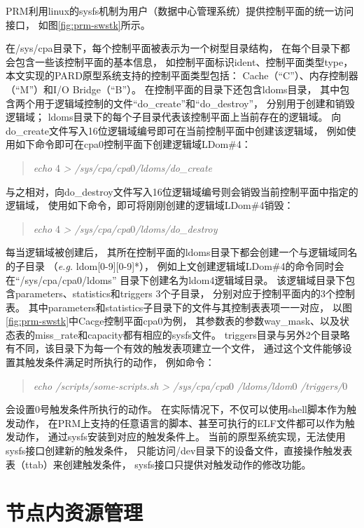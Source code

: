 PRM利用linux的sysfs机制为用户（数据中心管理系统）提供控制平面的统一访问接口，
如图\ref{fig:prm-swstk}所示。

在/sys/cpa目录下，每个控制平面被表示为一个树型目录结构，
在每个目录下都会包含一些该控制平面的基本信息，
如控制平面标识ident、控制平面类型type，
本文实现的PARD原型系统支持的控制平面类型包括：
Cache（``C''）、内存控制器（``M''）和I/O Bridge（``B''）。
在控制平面的目录下还包含ldoms目录，
其中包含两个用于逻辑域控制的文件``do\_create''和``do\_destroy''，
分别用于创建和销毁逻辑域；
ldoms目录下的每个子目录代表该控制平面上当前存在的逻辑域。
向do\_create文件写入16位逻辑域编号即可在当前控制平面中创建该逻辑域，
例如使用如下命令即可在cpa0控制平面下创建逻辑域LDom\#4：
\begin{verse}
\textit{echo} 4 \textit{> /sys/cpa/cpa}0\textit{/ldoms/do\_create}
\end{verse}
与之相对，向do\_destroy文件写入16位逻辑域编号则会销毁当前控制平面中指定的逻辑域，
使用如下命令，即可将刚刚创建的逻辑域LDom\#4销毁：
\begin{verse}
\textit{echo} 4 \textit{> /sys/cpa/cpa}0\textit{/ldoms/do\_destroy}
\end{verse}

每当逻辑域被创建后，
其所在控制平面的ldoms目录下都会创建一个与逻辑域同名的子目录
（\textit{e.g.} ldom[0-9][0-9]*），
例如上文创建逻辑域LDom\#4的命令同时会在``/sys/cpa/cpa0/ldoms''
目录下创建名为ldom4逻辑域目录。
该逻辑域目录下包含parameters、statistics和triggers 3个子目录，
分别对应于控制平面内的3个控制表。
其中parameters和statistics子目录下的文件与其控制表表项一一对应，
以图\ref{fig:prm-swstk}中Cacge控制平面cpa0为例，
其参数表的参数way\_mask、以及状态表的miss\_rate和capacity都有相应的sysfs文件。
triggers目录与另外2个目录略有不同，该目录下为每一个有效的触发表项建立一个文件，
通过这个文件能够设置其触发条件满足时所执行的动作，
例如命令：
\begin{verse}
\textit{echo /scripts/some-scripts.sh > /sys/cpa/cpa}0
\textit{/ldoms/ldom}0
\textit{/triggers/}0
\end{verse}
会设置0号触发条件所执行的动作。
在实际情况下，不仅可以使用shell脚本作为触发动作，
在PRM上支持的任意语言的脚本、甚至可执行的ELF文件都可以作为触发动作，
通过sysfs安装到对应的触发条件上。
当前的原型系统实现，无法使用sysfs接口创建新的触发条件，
只能访问/dev目录下的设备文件，直接操作触发表表（ttab）来创建触发条件，
sysfs接口只提供对触发动作的修改功能。


\section{节点内资源管理}

